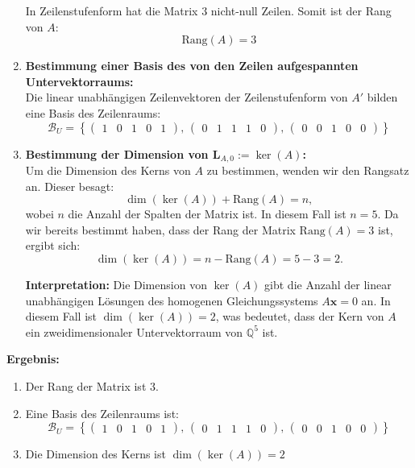 \documentclass[11pt]{article}
\begin{document}
\begin{enumerate}
    In Zeilenstufenform hat die Matrix \( 3 \) nicht-null Zeilen. Somit ist der Rang von \( A \):
    \[
    \text{Rang}(A) = 3
    \]

    \item \textbf{Bestimmung einer Basis des von den Zeilen aufgespannten Untervektorraums:} \\
    Die linear unabhängigen Zeilenvektoren der Zeilenstufenform von \( A' \) bilden eine Basis des Zeilenraums:
    \[
    \mathcal{B}_U = \left\{
    \begin{pmatrix} 1 & 0 & 1 & 0 & 1 \end{pmatrix}, \,
    \begin{pmatrix} 0 & 1 & 1 & 1 & 0 \end{pmatrix}, \,
    \begin{pmatrix} 0 & 0 & 1 & 0 & 0 \end{pmatrix}
    \right\}
    \]

    \item \textbf{Bestimmung der Dimension von \( \mathbf{L}_{A,0} := \ker(A) \):} \\
    Um die Dimension des Kerns von \( A \) zu bestimmen, wenden wir den Rangsatz an. Dieser besagt:
    \[
    \dim(\ker(A)) + \text{Rang}(A) = n,
    \]
    wobei \( n \) die Anzahl der Spalten der Matrix ist. In diesem Fall ist \( n = 5 \). Da wir bereits bestimmt haben, dass der Rang der Matrix \( \text{Rang}(A) = 3 \) ist, ergibt sich:
    \[
    \dim(\ker(A)) = n - \text{Rang}(A) = 5 - 3 = 2.
    \]

    \textbf{Interpretation:} Die Dimension von \( \ker(A) \) gibt die Anzahl der linear unabhängigen Lösungen des homogenen Gleichungssystems \( A \mathbf{x} = 0 \) an. In diesem Fall ist \( \dim(\ker(A)) = 2 \), was bedeutet, dass der Kern von \( A \) ein zweidimensionaler Untervektorraum von \( \mathbb{Q}^5 \) ist.

\end{enumerate}

\textbf{Ergebnis:}
\begin{enumerate}
    \item Der Rang der Matrix ist \( 3 \).
    \item Eine Basis des Zeilenraums ist:
    \[
    \mathcal{B}_U = \left\{
    \begin{pmatrix} 1 & 0 & 1 & 0 & 1 \end{pmatrix}, \,
    \begin{pmatrix} 0 & 1 & 1 & 1 & 0 \end{pmatrix}, \,
    \begin{pmatrix} 0 & 0 & 1 & 0 & 0 \end{pmatrix}
    \right\}
    \]
    \item Die Dimension des Kerns ist \( \dim(\ker(A)) = 2 \)
\end{enumerate}
\end{document}
